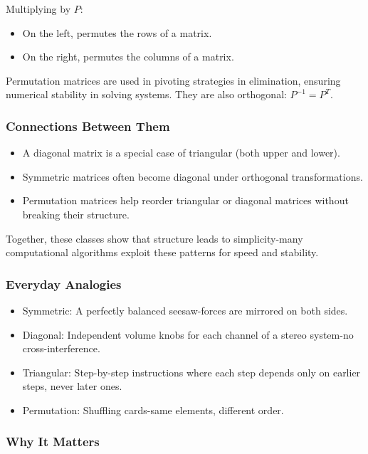 \documentclass[
  letterpaper,
  DIV=11,
  numbers=noendperiod]{scrreprt}
\providecommand{\tightlist}{%
  \setlength{\itemsep}{0pt}\setlength{\parskip}{0pt}}
\begin{document}
Multiplying by \(P\):

\begin{itemize}
\tightlist
\item
  On the left, permutes the rows of a matrix.
\item
  On the right, permutes the columns of a matrix.
\end{itemize}

Permutation matrices are used in pivoting strategies in elimination,
ensuring numerical stability in solving systems. They are also
orthogonal: \(P^{-1} = P^T\).

\subsubsection{Connections Between Them}\label{connections-between-them}

\begin{itemize}
\tightlist
\item
  A diagonal matrix is a special case of triangular (both upper and
  lower).
\item
  Symmetric matrices often become diagonal under orthogonal
  transformations.
\item
  Permutation matrices help reorder triangular or diagonal matrices
  without breaking their structure.
\end{itemize}

Together, these classes show that structure leads to simplicity-many
computational algorithms exploit these patterns for speed and stability.

\subsubsection{Everyday Analogies}\label{everyday-analogies-13}

\begin{itemize}
\tightlist
\item
  Symmetric: A perfectly balanced seesaw-forces are mirrored on both
  sides.
\item
  Diagonal: Independent volume knobs for each channel of a stereo
  system-no cross-interference.
\item
  Triangular: Step-by-step instructions where each step depends only on
  earlier steps, never later ones.
\item
  Permutation: Shuffling cards-same elements, different order.
\end{itemize}

\subsubsection{Why It Matters}\label{why-it-matters-13}
\end{document}
